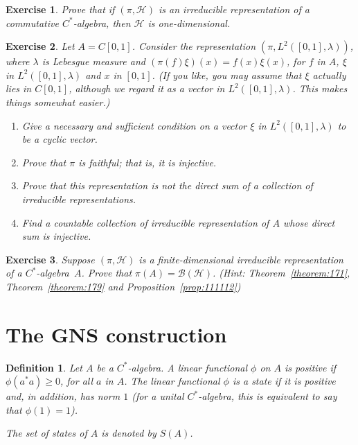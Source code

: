 \documentclass{book}
\newtheorem{definition}{Definition}[section]
\newtheorem{exercise}{Exercise}[section]
\def\cstar{\(C^*\)-algebra}
\begin{document}
\begin{exercise}\label{ex:1113}
  Prove that if \((\pi,\mathcal{H})\) is an irreducible representation of a
  commutative \cstar, then \(\mathcal{H}\) is one-dimensional.
\end{exercise}
\begin{exercise}
  Let \(A = C[0,1]\). Consider the representation
  \((\pi, L^2([0,1],\lambda))\), where \(\lambda\) is Lebesgue measure and \((\pi(f)\xi)(x) = f(x)\xi(x)\),
  for \(f\) in \(A\), \(\xi\) in \(L^2([0,1],\lambda)\) and \(x\) in \([0,1]\). (If you like, you may assume
  that \(\xi\) actually lies in \(C[0,1]\), although we regard it as a vector in \(L^2([0,1],\lambda)\).
  This makes things somewhat easier.)
  \begin{enumerate}
    \item Give a necessary and sufficient condition on a vector \(\xi\) in \(L^2([0,1],\lambda)\)
    to be a cyclic vector.
    \item Prove that \(\pi\) is faithful; that is, it is injective.
    \item Prove that this representation is not the direct sum of a collection of
    irreducible representations.
    \item Find a countable collection of irreducible representation of \(A\) whose
    direct sum is injective.
  \end{enumerate}
\end{exercise}
\begin{exercise}
  Suppose \((\pi,\mathcal{H})\) is a finite-dimensional irreducible representation of a \cstar\ \(A\). 
  Prove that \(\pi(A) = \mathcal{B}(\mathcal{H})\). (Hint: Theorem~\ref{theorem:171},
  Theorem~\ref{theorem:179} and Proposition~\ref{prop:111112})
\end{exercise}

\section{The GNS construction}
\begin{definition}
  Let \(A\) be a \cstar. A linear functional \(\phi\) on \(A\) is
  \textnormal{positive} if \(\phi(a^*a) \geq 0\), for all \(a\) in \(A\). The linear
  functional \(\phi\) is a \textnormal{state} if it is positive and, in addition, has norm \(1\) 
  (for a unital \cstar, this is equivalent to say that \(\phi(1)=1\)).\par
  The set of states of \(A\) is denoted by \(S(A)\). 
\end{definition}
\end{document}

